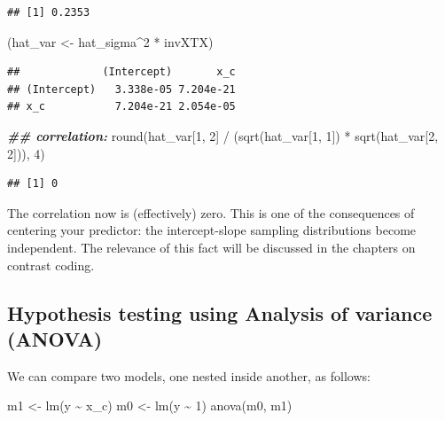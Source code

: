 \documentclass[
  12pt,
]{krantz}
\newenvironment{Shaded}{\begin{snugshade}}{\end{snugshade}}
\newcommand{\DecValTok}[1]{\textcolor[rgb]{0.00,0.00,0.81}{#1}}
\newcommand{\DocumentationTok}[1]{\textcolor[rgb]{0.56,0.35,0.01}{\textbf{\textit{#1}}}}
\newcommand{\FunctionTok}[1]{\textcolor[rgb]{0.00,0.00,0.00}{#1}}
\newcommand{\NormalTok}[1]{#1}
\newcommand{\OtherTok}[1]{\textcolor[rgb]{0.56,0.35,0.01}{#1}}
\newcommand{\SpecialCharTok}[1]{\textcolor[rgb]{0.00,0.00,0.00}{#1}}
\theoremstyle{definition}
\theoremstyle{definition}
\theoremstyle{definition}
\theoremstyle{definition}
\theoremstyle{remark}
\begin{document}
\begin{verbatim}
## [1] 0.2353
\end{verbatim}

\begin{Shaded}
\begin{Highlighting}[]
\NormalTok{(hat\_var }\OtherTok{\textless{}{-}}\NormalTok{ hat\_sigma}\SpecialCharTok{\^{}}\DecValTok{2} \SpecialCharTok{*}\NormalTok{ invXTX)}
\end{Highlighting}
\end{Shaded}

\begin{verbatim}
##             (Intercept)       x_c
## (Intercept)   3.338e-05 7.204e-21
## x_c           7.204e-21 2.054e-05
\end{verbatim}

\begin{Shaded}
\begin{Highlighting}[]
\DocumentationTok{\#\# correlation:}
\FunctionTok{round}\NormalTok{(hat\_var[}\DecValTok{1}\NormalTok{, }\DecValTok{2}\NormalTok{] }\SpecialCharTok{/}\NormalTok{ (}\FunctionTok{sqrt}\NormalTok{(hat\_var[}\DecValTok{1}\NormalTok{, }\DecValTok{1}\NormalTok{]) }\SpecialCharTok{*} \FunctionTok{sqrt}\NormalTok{(hat\_var[}\DecValTok{2}\NormalTok{, }\DecValTok{2}\NormalTok{])), }\DecValTok{4}\NormalTok{)}
\end{Highlighting}
\end{Shaded}

\begin{verbatim}
## [1] 0
\end{verbatim}

The correlation now is (effectively) zero. This is one of the consequences of centering your predictor: the intercept-slope sampling distributions become independent. The relevance of this fact will be discussed in the chapters on contrast coding.

\hypertarget{hypothesis-testing-using-analysis-of-variance-anova}{%
\subsection{Hypothesis testing using Analysis of variance (ANOVA)}\label{hypothesis-testing-using-analysis-of-variance-anova}}

We can compare two models, one nested inside another, as follows:

\begin{Shaded}
\begin{Highlighting}[]
\NormalTok{m1 }\OtherTok{\textless{}{-}} \FunctionTok{lm}\NormalTok{(y }\SpecialCharTok{\textasciitilde{}}\NormalTok{ x\_c)}
\NormalTok{m0 }\OtherTok{\textless{}{-}} \FunctionTok{lm}\NormalTok{(y }\SpecialCharTok{\textasciitilde{}} \DecValTok{1}\NormalTok{)}
\FunctionTok{anova}\NormalTok{(m0, m1)}
\end{Highlighting}
\end{Shaded}
\end{document}
